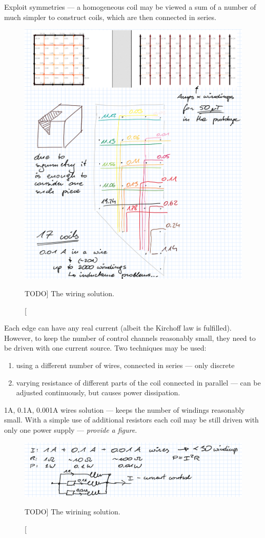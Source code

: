 Exploit symmetries --- a homogeneous coil may be viewed a sum of a number of
much simpler to construct coils, which are then connected in series.

\begin{figure}
  \centering
  \includegraphics[width=.6\linewidth]{gfx/coils/wiring}
  \caption
  [TODO]
  {%
The wiring solution.}
  \label{fig:coils_wiring}
\end{figure}

Each edge can have any real current (albeit the Kirchoff law is fulfilled).
However, to keep the number of control channels reasonably small, they need
to be driven with one current source. Two techniques may be used:
\begin{enumerate}
  \item using a different number of wires, connected in series --- only discrete
  \item varying resistance of different parts of the coil connected in parallel
  --- can be adjusted continuously, but causes power dissipation.
\end{enumerate}

1A, 0.1A, 0.001A wires solution --- keeps the number of windings reasonably small.
With a simple use of additional resistors each coil may be still driven with only
one power supply --- \emph{provide a figure}.

\begin{figure}
  \centering
  \includegraphics[width=.6\linewidth]{gfx/coils/current_discretisation}
  \caption
  [TODO]
  {%
The wirining solution.}
  \label{fig:coils_current_discretisation}
\end{figure}

